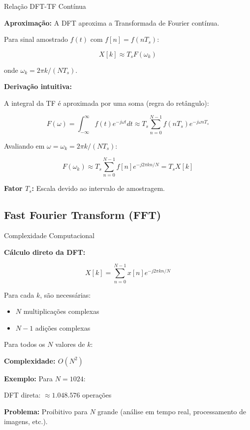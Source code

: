 
\begin{frame}{Relação DFT-TF Contínua}

\textbf{Aproximação:} A DFT aproxima a Transformada de Fourier contínua.

Para sinal amostrado $f(t)$ com $f[n] = f(nT_s)$:

\[
X[k] \approx T_s F(\omega_k)
\]

onde $\omega_k = 2\pi k/(NT_s)$.

\vspace{0.1cm}

\textbf{Derivação intuitiva:}

A integral da TF é aproximada por uma soma (regra do retângulo):

\[
F(\omega) = \int_{-\infty}^{\infty} f(t) e^{-j\omega t} dt \approx T_s \sum_{n=0}^{N-1} f(nT_s) e^{-j\omega nT_s}
\]

Avaliando em $\omega = \omega_k = 2\pi k/(NT_s)$:

\[
F(\omega_k) \approx T_s \sum_{n=0}^{N-1} f[n] e^{-j2\pi kn/N} = T_s X[k]
\]

\textbf{Fator $T_s$:} Escala devido ao intervalo de amostragem.

\end{frame}


\subsection{Fast Fourier Transform (FFT)}

\begin{frame}{Complexidade Computacional}

\textbf{Cálculo direto da DFT:}

\[
X[k] = \sum_{n=0}^{N-1} x[n] e^{-j2\pi kn/N}
\]

Para cada $k$, são necessárias:
\begin{itemize}
\item $N$ multiplicações complexas
\item $N-1$ adições complexas
\end{itemize}

Para todos os $N$ valores de $k$:

\textbf{Complexidade: $O(N^2)$}

\vspace{0.1cm}

\textbf{Exemplo:} Para $N = 1024$:

DFT direta: $\approx 1.048.576$ operações

\vspace{0.1cm}

\textbf{Problema:} Proibitivo para $N$ grande (análise em tempo real, processamento de imagens, etc.).

\end{frame}

